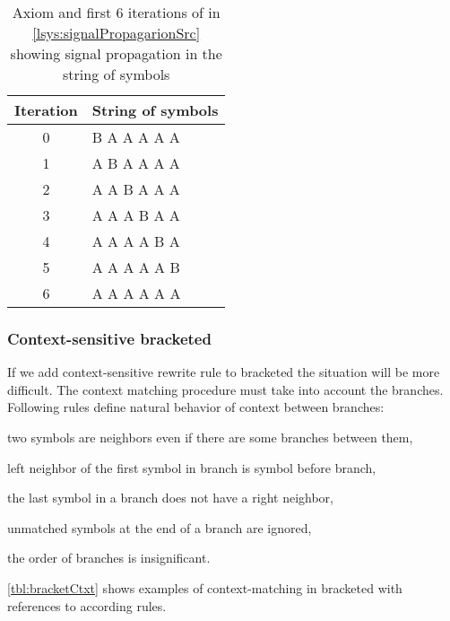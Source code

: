 \begin{table}[h]
	\centering
	\begin{tabular}{c l}
   		\toprule
   		Iteration & String of symbols \\
   		\midrule
		0 & B A A A A A \\
		1 & A B A A A A \\
		2 & A A B A A A \\
		3 & A A A B A A \\
		4 & A A A A B A \\
		5 & A A A A A B \\
		6 & A A A A A A \\
		\bottomrule
	\end{tabular}
	\caption{Axiom and first 6 iterations of \lsystem in \autoref{lsys:signalPropagarionSrc} showing signal propagation in the string of symbols}
	\label{fig:signalPropagarion}
\end{table}


\subsubsection{Context-sensitive bracketed \lsystems}

If we add context-sensitive rewrite rule to bracketed \lsystems the situation will be more difficult.
The context matching procedure must take into account the branches.
Following rules define natural behavior of context between branches:
\begin{enumerate*}
	\item \label{enum:ctxRule1} two symbols are neighbors even if there are some branches between them,
	\item \label{enum:ctxRule2} left neighbor of the first symbol in branch is symbol before branch,
	\item \label{enum:ctxRule3} the last symbol in a branch does not have a right neighbor,
	\item \label{enum:ctxRule4} unmatched symbols at the end of a branch are ignored,
	\item \label{enum:ctxRule5} the order of branches is insignificant.
\end{enumerate*}

\autoref{tbl:bracketCtxt} shows examples of context-matching in bracketed \lsystems with references to according rules.

